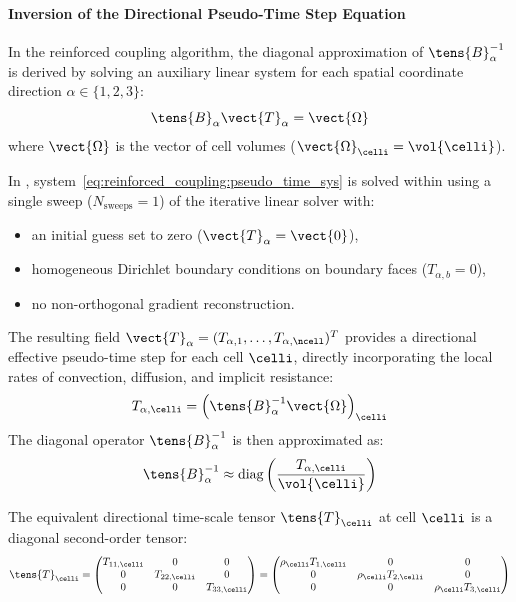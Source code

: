 \paragraph{Inversion of the Directional Pseudo-Time Step Equation}
In the reinforced coupling algorithm, the diagonal approximation of $\tens{B}_\alpha^{-1}$
is derived by solving an auxiliary linear system for each spatial coordinate
direction $\alpha \in \{1, 2, 3\}$:
\begin{equation}
  \tens{B}_\alpha \vect{T}_\alpha = \vect{\Omega}
  \label{eq:reinforced_coupling:pseudo_time_sys}
\end{equation}
where $\vect{\Omega}$ is the vector of cell volumes ($\vect{\Omega}_\celli = \vol{\celli}$).

In \CS, system~\eqref{eq:reinforced_coupling:pseudo_time_sys} is solved within
 using a single sweep ($N_{\text{sweeps}} = 1$) of the
iterative linear solver with:
\begin{itemize}
\item an initial guess set to zero ($\vect{T}_\alpha = \vect{0}$),
\item homogeneous Dirichlet boundary conditions on boundary faces ($T_{\alpha,b} = 0$),
\item no non-orthogonal gradient reconstruction.
\end{itemize}

The resulting field $\vect{T}_\alpha = (T_{\alpha,1}, \dots, T_{\alpha,\ncell})^T$
provides a directional effective pseudo-time step for each cell $\celli$, directly
incorporating the local rates of convection, diffusion, and implicit resistance:
\begin{equation}
  T_{\alpha,\celli} = \left( \tens{B}_\alpha^{-1} \vect{\Omega} \right)_\celli
\end{equation}
The diagonal operator $\tens{B}_\alpha^{-1}$ is then approximated as:
\begin{equation}
  \tens{B}_\alpha^{-1} \approx \text{diag} \left( \frac{T_{\alpha,\celli}}{\vol{\celli}} \right)
\end{equation}

The equivalent directional time-scale tensor $\tens{T}_\celli$ at cell $\celli$ is
a diagonal second-order tensor:
\begin{equation}
  \tens{T}_\celli = \begin{pmatrix}
    T_{11,\celli} & 0 & 0 \\
    0 & T_{22,\celli} & 0 \\
    0 & 0 & T_{33,\celli}
  \end{pmatrix}
  = \begin{pmatrix}
    \rho_\celli T_{1,\celli} & 0 & 0 \\
    0 & \rho_\celli T_{2,\celli} & 0 \\
    0 & 0 & \rho_\celli T_{3,\celli}
  \end{pmatrix}
  \label{eq:reinforced_coupling:tensor_T}
\end{equation}

